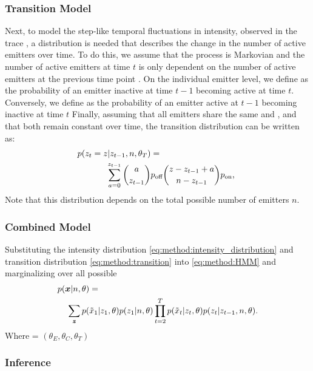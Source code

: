 \subsubsection{Transition Model}
Next, to model the step-like temporal fluctuations in intensity, observed in the trace \trace, 
  a distribution is needed that describes the change in the number of active emitters \z{} over time. 
  To do this, we assume that the process is Markovian and the number of active emitters  
  at time $t$ is only dependent on the number of active emitters at the previous time point .
  On the individual emitter level, we define \pon as the probability of an emitter inactive at time $t-1$ becoming active at time $t$. 
  Conversely,  we define \poff as the probability of an emitter active at $t-1$ becoming inactive at time $t$ 
  Finally, assuming that all emitters share the same \pon and \poff, and that both remain constant over time, 
  the transition distribution can be written as:
  \begin{align}
    \label{eq:method:transition}
    p(z_{t} = z | z_{t-1}, n, \theta_{T}) &=\\
    \sum_{a = 0}^{z_{t-1}}
      {a \choose z_{t-1}}
      &\poff
      {z - z_{t-1} + a \choose \n - z_{t-1}}
      \pon
      \text{,} \notag\
  \end{align}
  Note that this distribution depends on the total possible number of emitters $n$.

\subsubsection{Combined Model}

Substituting the intensity distribution \eqref{eq:method:intensity_distribution} 
and transition distribution \eqref{eq:method:transition} 
into \eqref{eq:method:HMM} and marginalizing over all possible \states
% 
\begin{align}
  \label{eq:method:likelihood}
  p(\bm{x}|n,\theta) &=\\
    \sum_{\bm{z}}
      p(&\tilde{x}_{1}|z_{1}, \theta)
      p(z_{1}|n, \theta)
      \prod_{t=2}^{T}
        p(\tilde{x}_{t}|z_{t}, \theta)
        p(z_{t}|z_{t-1},n, \theta)
    \notag
  \text{.}
\end{align}
%
Where \parameters = $(\theta_{E}, \theta_{C}, \theta_{T})$

\subsubsection{Inference}


